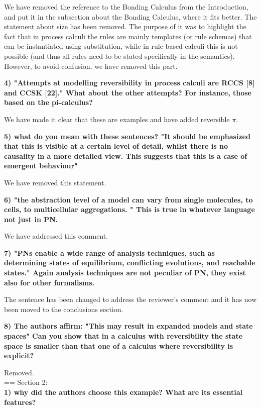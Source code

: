 \documentclass{article}
\begin{document}
We have removed the reference to the Bonding Calculus from the Introduction, and put it in the subsection 
about the Bonding Calculus, where it fits better. The statement about size has been removed. 
The purpose of it was to highlight the fact that in process
calculi the rules are mainly templates (or rule schemas) that can be instantiated using
substitution, while in rule-based calculi this is not possible (and thus all
rules need to be stated specifically in the semantics). However, to avoid confusion, we have removed 
this part.

\textbf{4) "Attempts at modelling reversibility in process calculi are RCCS [8] and CCSK [22]." What about the other attempts? For instance, those based on the pi-calculus?}

We have made it clear that these are examples and have added reversible $\pi$. 

\textbf{5) what do you mean with these sentences? "It should be emphasized that this is visible at a certain level of detail, whilst there is no causality in a more detailed view. This suggests that this is a case of emergent behaviour"}

We have removed this statement.

\textbf{6) "the abstraction level of a model can vary from single molecules, to cells, to multicellular aggregations. "
This is true in whatever language not just in PN.}

We have addressed this comment. 

\textbf{7) "PNs enable a wide range of analysis techniques, such as determining states of equilibrium, conflicting evolutions, and reachable states."
Again analysis techniques are not peculiar of PN, they exist also for other formalisms.}

The sentence has been changed to address the reviewer's comment and it has now been moved to the conclusions
section. 

\textbf{8) The authors affirm: 
"This may result in expanded models and state spaces" Can you show that in a calculus with reversibility the state space is smaller than that one of a calculus where reversibility is explicit?}

Removed.\\

== Section 2:\\ 

\textbf{1) why did the authors choose this example? What are its essential features?}
\end{document}
